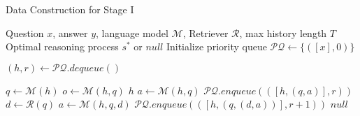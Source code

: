 \begin{algorithm}
\footnotesize
\caption{Data Construction for Stage I}
\label{algorithm:imi}
\begin{algorithmic}[1]
\Require Question $x$, answer $y$, language model $\mathcal{M}$, Retriever $\mathcal{R}$, max history length $T$
\Ensure Optimal reasoning process $s^*$ or $null$
\State Initialize priority queue $\mathcal{PQ} \gets \{([x], 0)\}$ 

    \State $(h, r) \gets \mathcal{PQ}.dequeue()$ 
    
    \State $q \gets \mathcal{M}(h)$ 
        \State $o \gets \mathcal{M}(h, q)$ 
            \Return $h$
        \EndIf
    \Else
        \State $a \gets \mathcal{M}(h, q)$ 
        \State $\mathcal{PQ}.enqueue(([h, (q, a)], r))$
        \State $d \gets \mathcal{R}(q)$ 
        \State $a \gets \mathcal{M}(h, q, d)$ 
        \State $\mathcal{PQ}.enqueue(([h, (q, (d, a))], r+1))$
    \EndIf
\EndWhile
\State \Return $null$
\end{algorithmic}
\end{algorithm}